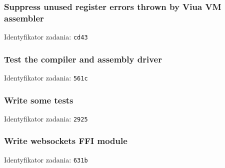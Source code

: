 \subsubsection{Suppress unused register errors thrown by Viua VM assembler}

Identyfikator zadania: \texttt{cd43}

\subsubsection{Test the compiler and assembly driver}

Identyfikator zadania: \texttt{561c}

\subsubsection{Write some tests}

Identyfikator zadania: \texttt{2925}

\subsubsection{Write websockets FFI module}

Identyfikator zadania: \texttt{631b}
